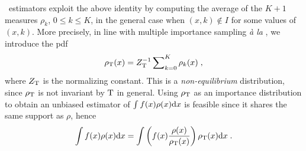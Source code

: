 \documentclass{article}
\begin{document}
\IFIS\ estimators exploit the above identity by computing the average of the $K+1$ measures $\rho_k$, $0\leq k \leq K$, in the general case when $(x,k) \notin I$ for some values of $(x,k)$. More precisely, in line with multiple importance sampling \emph{\`a la} \cite{owen:zhou:2000}, we introduce the pdf
\begin{equation}\label{eq:rhoT}
    \rhoT(x) =  \constT^{-1}\sum\nolimits_{k = 0}^K \rho_k(x)\eqsp, %
  \end{equation}
where $Z_{\operatorname{T}}$ is the normalizing constant.
This is a \textit{non-equilibrium} distribution, since $\rho_{\operatorname{T}}$ is not invariant by $\operatorname{T}$ in general.
Using $\rho_{\operatorname{T}}$ as an importance distribution to obtain an unbiased
  estimator of $\int f(x) \rho(x) \mathrm{d} x$ is feasible since it shares the same support as $\rho$, hence
  \[\int f(x) \rho(x)  \mathrm{d} x =\int \left(f(x) \frac{\rho(x)}{\rho_{\operatorname{T}}(x)}\right) \rho_{\operatorname{T}}(x)  \mathrm{d} x\;.\]
\end{document}
